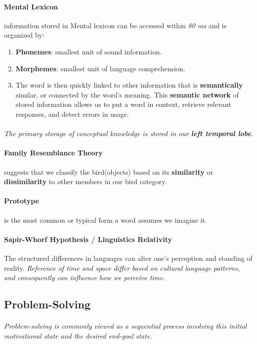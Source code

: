 \documentclass{article}
\begin{document}
	\paragraph{Mental Lexicon} information stored in Mental lexicon can be accessed within \emph{80 ms} and is organized by: 
	\begin{enumerate}
		\item \textbf{Phonemes}: smallest unit of sound information.
		\item \textbf{Morphemes}: smallest unit of language comprehension.
		\item The word is then quickly linked to other information that is \textbf{semantically} similar, or connected by the word's meaning. This \textbf{semantic network} of stored information allows us to put a word in context, retrieve relevant responses, and detect errors in usage.
	\end{enumerate}
	\paragraph{} \emph{The primary storage of conceptual knowledge is stored in our \textbf{left temporal lobe}}.

	\paragraph{Family Resemblance Theory} suggests that we classify the bird(objects) based on its \textbf{similarity} or \textbf{dissimilarity} to other members in our bird category.

	\paragraph{Prototype} is the most common or typical form a word assumes we imagine it.

	\paragraph{Sapir-Whorf Hypothesis / Linguistics Relativity} The structured differences in languages can alter one's perception and standing of reality. \emph{Reference of time and space differ based on cultural language patterns, and consequently can influence how we perceive time.}

	\subsection{Problem-Solving}
	\paragraph{} \emph{Problem-solving is commonly viewed as a sequential process involving this initial motivational state and the desired end-goal state}.
\end{document}
